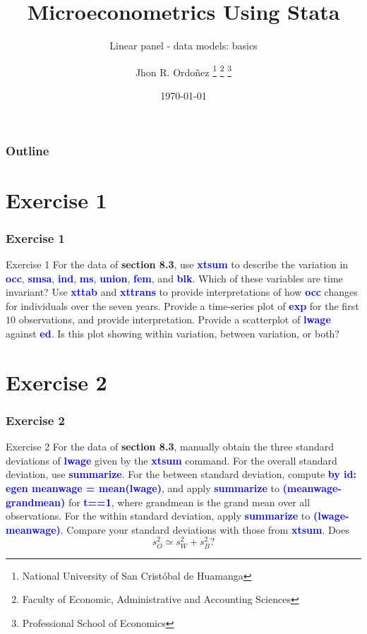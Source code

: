 \documentclass[11pt, aspectratio=169]{beamer}
\title{Microeconometrics Using Stata}
\subtitle{Linear panel - data models: basics}
\author{
		Jhon R. Ordoñez
		\footnote{\label{1} National University of San Cristóbal de Huamanga}
		\footnote{\label{2} Faculty of Economic, Administrative and Accounting Sciences}
		\footnote{\label{3} Professional School of Economics}
	}
\date{\today}
\begin{document}
	\begin{frame}
		\maketitle
	\end{frame}
	\begin{frame}[t]
		\frametitle{Outline}
		\tableofcontents
	\end{frame}
	\section{Exercise 1}
		\begin{frame}
			\frametitle{Exercise 1}
				\begin{block}{Exercise 1}
					For the data of \textcolor{red!50}{\textbf{section 8.3}}, use \textcolor{blue}{\textbf{xtsum}} 
					to describe the variation in \textcolor{blue}{\textbf{occ}},
					\textcolor{blue}{\textbf{smsa}}, \textcolor{blue}{\textbf{ind}}, \textcolor{blue}{\textbf{ms}},
					\textcolor{blue}{\textbf{union}}, \textcolor{blue}{\textbf{fem}},
					and \textcolor{blue}{\textbf{blk}}. Which of these variables are time
					invariant? Use \textcolor{blue}{\textbf{xttab}} and \textcolor{blue}{\textbf{xttrans}} to provide interpretations of how
					\textcolor{blue}{\textbf{occ}} changes for individuals over the seven years. Provide a time-series
					plot of \textcolor{blue}{\textbf{exp}} for the first $10$ observations, and provide interpretation.
					Provide a scatterplot of \textcolor{blue}{\textbf{lwage}} against \textcolor{blue}{\textbf{ed}}. Is this plot showing within
					variation, between variation, or both?
				\end{block}
		\end{frame}
	\section{Exercise 2}
		\begin{frame}
			\frametitle{Exercise 2}
			\begin{block}{Exercise 2}
				For the data of \textcolor{red!50}{\textbf{section 8.3}}, manually obtain the three standard
				deviations of \textcolor{blue}{\textbf{lwage}} given by the \textcolor{blue}{\textbf{xtsum}} command. For the overall
				standard deviation, use \textcolor{blue}{\textbf{summarize}}. For the between standard
				deviation, compute \textcolor{blue}{\textbf{by id: egen meanwage = mean(lwage)}}, and apply
				\textcolor{blue}{\textbf{summarize}} to \textcolor{blue}{\textbf{(meanwage-grandmean)}} for \textcolor{blue}{\textbf{t==1}}, where grandmean is
				the grand mean over all observations. For the within standard
				deviation, apply \textcolor{blue}{\textbf{summarize}} to \textcolor{blue}{\textbf{(lwage-meanwage)}}. Compare your
				standard deviations with those from \textcolor{blue}{\textbf{xtsum}}. Does
					\begin{equation}
						s_{O}^{2} \simeq s_{W}^{2} + s_{B}^{2}?
					\end{equation}
			\end{block}
		\end{frame}
\end{document}
